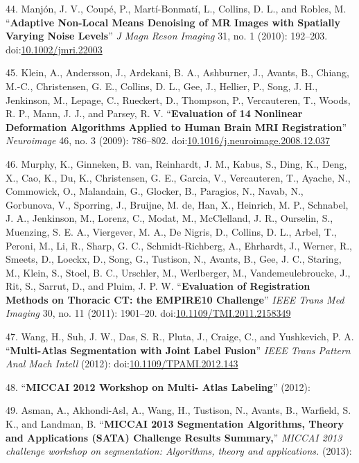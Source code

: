 \documentclass[11pt,]{article}
\begin{document}
44. Manj{ó}n, J. V., Coup{é}, P., Mart{í}-Bonmat{í}, L., Collins, D. L.,
and Robles, M. ``\textbf{Adaptive Non-Local Means Denoising of MR Images
with Spatially Varying Noise Levels}'' \emph{J Magn Reson Imaging} 31,
no. 1 (2010): 192--203.
doi:\href{http://dx.doi.org/10.1002/jmri.22003}{10.1002/jmri.22003}

45. Klein, A., Andersson, J., Ardekani, B. A., Ashburner, J., Avants,
B., Chiang, M.-C., Christensen, G. E., Collins, D. L., Gee, J., Hellier,
P., Song, J. H., Jenkinson, M., Lepage, C., Rueckert, D., Thompson, P.,
Vercauteren, T., Woods, R. P., Mann, J. J., and Parsey, R. V.
``\textbf{Evaluation of 14 Nonlinear Deformation Algorithms Applied to
Human Brain MRI Registration}'' \emph{Neuroimage} 46, no. 3 (2009):
786--802.
doi:\href{http://dx.doi.org/10.1016/j.neuroimage.2008.12.037}{10.1016/j.neuroimage.2008.12.037}

46. Murphy, K., Ginneken, B. van, Reinhardt, J. M., Kabus, S., Ding, K.,
Deng, X., Cao, K., Du, K., Christensen, G. E., Garcia, V., Vercauteren,
T., Ayache, N., Commowick, O., Malandain, G., Glocker, B., Paragios, N.,
Navab, N., Gorbunova, V., Sporring, J., Bruijne, M. de, Han, X.,
Heinrich, M. P., Schnabel, J. A., Jenkinson, M., Lorenz, C., Modat, M.,
McClelland, J. R., Ourselin, S., Muenzing, S. E. A., Viergever, M. A.,
De Nigris, D., Collins, D. L., Arbel, T., Peroni, M., Li, R., Sharp, G.
C., Schmidt-Richberg, A., Ehrhardt, J., Werner, R., Smeets, D., Loeckx,
D., Song, G., Tustison, N., Avants, B., Gee, J. C., Staring, M., Klein,
S., Stoel, B. C., Urschler, M., Werlberger, M., Vandemeulebroucke, J.,
Rit, S., Sarrut, D., and Pluim, J. P. W. ``\textbf{Evaluation of
Registration Methods on Thoracic CT: the EMPIRE10 Challenge}''
\emph{IEEE Trans Med Imaging} 30, no. 11 (2011): 1901--20.
doi:\href{http://dx.doi.org/10.1109/TMI.2011.2158349}{10.1109/TMI.2011.2158349}

47. Wang, H., Suh, J. W., Das, S. R., Pluta, J., Craige, C., and
Yushkevich, P. A. ``\textbf{Multi-Atlas Segmentation with Joint Label
Fusion}'' \emph{IEEE Trans Pattern Anal Mach Intell} (2012):
doi:\href{http://dx.doi.org/10.1109/TPAMI.2012.143}{10.1109/TPAMI.2012.143}

48. ``\textbf{MICCAI 2012 Workshop on Multi- Atlas Labeling}'' (2012):

49. Asman, A., Akhondi-Asl, A., Wang, H., Tustison, N., Avants, B.,
Warfield, S. K., and Landman, B. ``\textbf{MICCAI 2013 Segmentation
Algorithms, Theory and Applications (SATA) Challenge Results Summary,}''
\emph{MICCAI 2013 challenge workshop on segmentation: Algorithms, theory
and applications.} (2013):
\end{document}
